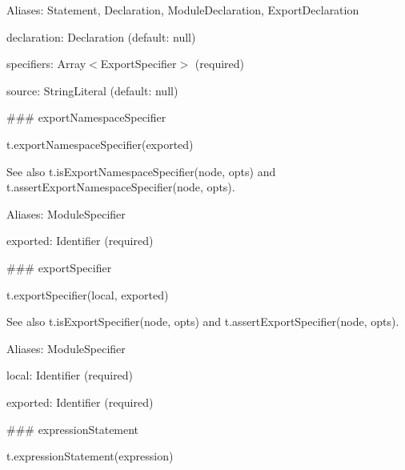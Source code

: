 Aliases\+: {\ttfamily Statement}, {\ttfamily Declaration}, {\ttfamily Module\+Declaration}, {\ttfamily Export\+Declaration}


\begin{DoxyItemize}
\item {\ttfamily declaration}\+: {\ttfamily Declaration} (default\+: {\ttfamily null})
\item {\ttfamily specifiers}\+: {\ttfamily Array$<$Export\+Specifier$>$} (required)
\item {\ttfamily source}\+: {\ttfamily String\+Literal} (default\+: {\ttfamily null}) 


\end{DoxyItemize}

\#\#\# export\+Namespace\+Specifier 
\begin{DoxyCode}
t.exportNamespaceSpecifier(exported)
\end{DoxyCode}


See also {\ttfamily t.\+is\+Export\+Namespace\+Specifier(node, opts)} and {\ttfamily t.\+assert\+Export\+Namespace\+Specifier(node, opts)}.

Aliases\+: {\ttfamily Module\+Specifier}


\begin{DoxyItemize}
\item {\ttfamily exported}\+: {\ttfamily Identifier} (required) 


\end{DoxyItemize}

\#\#\# export\+Specifier 
\begin{DoxyCode}
t.exportSpecifier(local, exported)
\end{DoxyCode}


See also {\ttfamily t.\+is\+Export\+Specifier(node, opts)} and {\ttfamily t.\+assert\+Export\+Specifier(node, opts)}.

Aliases\+: {\ttfamily Module\+Specifier}


\begin{DoxyItemize}
\item {\ttfamily local}\+: {\ttfamily Identifier} (required)
\item {\ttfamily exported}\+: {\ttfamily Identifier} (required) 


\end{DoxyItemize}

\#\#\# expression\+Statement 
\begin{DoxyCode}
t.expressionStatement(expression)
\end{DoxyCode}


